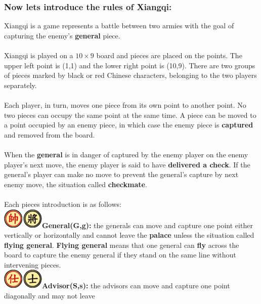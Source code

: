 \documentclass[12pt,a4paper]{article}
\begin{document}
\subsubsection*{Now let\textquotesingle s introduce the rules of Xiangqi:}
Xiangqi is a game represents a battle between two armies with the goal
of capturing the enemy's \textbf{general} piece.
\\\\
\noindent
Xiangqi is played on a $10\times9$ board and pieces are
placed on the points. The upper left point is (1,1) and
the lower right point is (10,9). There are two groups of pieces marked
by black or red Chinese characters, belonging to the two players
separately.
\\\\
\noindent
Each player, in turn, moves one piece from its own point to another point. No two pieces can occupy the
same point at the same time. A piece can be moved to a point occupied
by an enemy piece, in which case the enemy piece is \textbf{captured} and
removed from the board. 
\\\\
\noindent
When the \textbf{general} is in danger of captured
by the enemy player on the enemy player's next move, the enemy player is
said to have \textbf{delivered a check}. If the general's player can make no
move to prevent the general's capture by next enemy move, the situation called \textbf{checkmate}.\\\\
\noindent
Each piece\textquotesingle s introduction is as follows:
\\\noindent
\textbf{\includegraphics{Xiangqi.assets/75px-Xiangqi_General.png}General(G,g):}
the generals can move and capture one point either vertically or
horizontally and cannot leave the \textbf{palace} unless the situation called
\textbf{flying general}. \textbf{Flying general} means that
one general can \textbf{fly} across the board to capture the enemy general if
they stand on the same line without intervening pieces.
\\\noindent
\textbf{\includegraphics{Xiangqi.assets/75px-Xiangqi_Advisor.png}Advisor(S,s):}
the advisors can move and capture one point diagonally and may not leave
\end{document}
